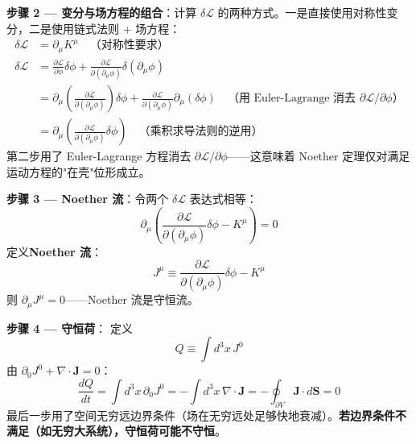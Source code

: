 \textbf{步骤 2 — 变分与场方程的组合}：计算 $\delta\mathcal{L}$ 的两种方式。一是直接使用对称性变分，二是使用链式法则 + 场方程：
\begin{align}
\delta\mathcal{L} &= \partial_\mu K^\mu \quad \text{（对称性要求）} \\
\delta\mathcal{L} &= \frac{\partial\mathcal{L}}{\partial\phi}\delta\phi
+ \frac{\partial\mathcal{L}}{\partial(\partial_\mu\phi)}\delta(\partial_\mu\phi) \\
&= \partial_\mu\!\left(\frac{\partial\mathcal{L}}{\partial(\partial_\mu\phi)}\right)\delta\phi
+ \frac{\partial\mathcal{L}}{\partial(\partial_\mu\phi)}\partial_\mu(\delta\phi)
\quad\text{（用 Euler-Lagrange 消去 $\partial\mathcal{L}/\partial\phi$）} \\
&= \partial_\mu\!\left(\frac{\partial\mathcal{L}}{\partial(\partial_\mu\phi)}\delta\phi\right)
\quad\text{（乘积求导法则的逆用）}
\end{align}
\fbox{[S]} 第二步用了 Euler-Lagrange 方程消去 $\partial\mathcal{L}/\partial\phi$——这意味着 Noether 定理仅对满足运动方程的"在壳"位形成立。

\textbf{步骤 3 — Noether 流}：令两个 $\delta\mathcal{L}$ 表达式相等：
\begin{equation}
\partial_\mu\!\left(\frac{\partial\mathcal{L}}{\partial(\partial_\mu\phi)}\delta\phi - K^\mu\right) = 0
\end{equation}
\fbox{[S]} 定义\textbf{Noether 流}：
\begin{equation}
\boxed{J^\mu \equiv \frac{\partial\mathcal{L}}{\partial(\partial_\mu\phi)}\delta\phi - K^\mu}
\end{equation}
则 $\partial_\mu J^\mu = 0$——Noether 流是守恒流。

\textbf{步骤 4 — 守恒荷}：\fbox{[S]} 定义
\begin{equation}
Q \equiv \int d^3x\, J^0
\end{equation}
由 $\partial_0 J^0 + \nabla\cdot\mathbf{J} = 0$：
\begin{equation}
\frac{dQ}{dt} = \int d^3x\, \partial_0 J^0 = -\int d^3x\, \nabla\cdot\mathbf{J}
= -\oint_{\partial V} \mathbf{J}\cdot d\mathbf{S} = 0
\end{equation}
\fbox{[N]} 最后一步用了空间无穷远边界条件（场在无穷远处足够快地衰减）。\textbf{若边界条件不满足（如无穷大系统），守恒荷可能不守恒}。


